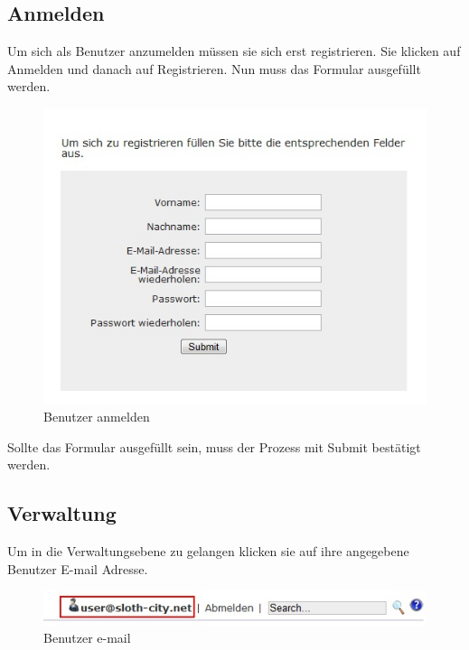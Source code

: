 \documentclass[a4paper,11pt]{scrartcl}
\begin{document}
\subsection{Anmelden}
Um sich als Benutzer anzumelden müssen sie sich erst registrieren. Sie klicken auf Anmelden und danach auf Registrieren. Nun muss das Formular ausgefüllt werden.
\begin{figure}[h]
\centering
\includegraphics[width = 10 cm]{img/benutzeranmelden}
\caption{Benutzer anmelden}
\label{Benutzer anmelden}
\end{figure}

Sollte das Formular ausgefüllt sein, muss der Prozess mit Submit bestätigt werden.

\subsection{Verwaltung}
Um in die Verwaltungsebene zu gelangen klicken sie auf ihre angegebene Benutzer E-mail Adresse.
\begin{figure}[h]
\centering
\includegraphics[width = 10 cm]{img/benutzeremail}
\caption{Benutzer e-mail}
\label{Benutzer e-mail}
\end{figure}

\newpage
\end{document}
